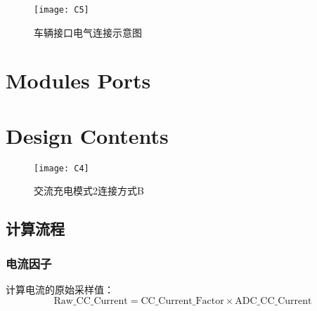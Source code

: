 \begin{figure}[!htbp]
    \centering
    \texttt{[image: C5]}
    \caption{车辆接口电气连接示意图}
    \label{fig:C5}
\end{figure}

\section{Modules Ports}


\section{Design Contents}








\begin{figure}[!htbp]
    \centering
    \texttt{[image: C4]}
    \caption{交流充电模式2连接方式B\cite{GB18487_1}}
    \label{fig:C3}
\end{figure}



\subsection{计算流程}
\subsubsection*{电流因子}
        计算电流的原始采样值：
            \begin{equation}
                \mathrm{Raw\_CC\_Current} = \mathrm{CC\_Current\_Factor} \times  \mathrm{ADC\_CC\_Current}
                \label{eq:CC1}
            \end{equation}

